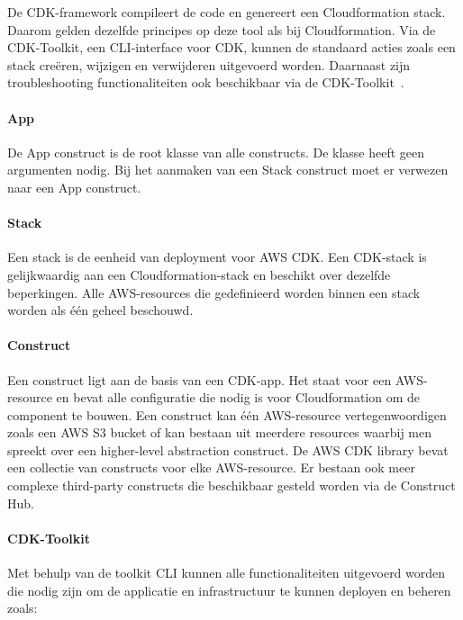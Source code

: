 De CDK-framework compileert de code en genereert een Cloudformation stack.
Daarom gelden dezelfde principes op deze tool als bij Cloudformation.
Via de CDK-Toolkit, een CLI-interface voor CDK, kunnen de standaard acties zoals een stack creëren, wijzigen en verwijderen uitgevoerd worden.
Daarnaast zijn troubleshooting functionaliteiten ook beschikbaar via de CDK-Toolkit~\autocite{Mansoor2014}.

\paragraph{App}

De App construct is de root klasse van alle constructs.
De klasse heeft geen argumenten nodig.
Bij het aanmaken van een Stack construct moet er verwezen naar een App construct.

\paragraph{Stack}

Een stack is de eenheid van deployment voor AWS CDK.
Een CDK-stack is gelijkwaardig aan een Cloudformation-stack en beschikt over dezelfde beperkingen.
Alle AWS-resources die gedefinieerd worden binnen een stack worden als één geheel beschouwd.

\paragraph{Construct}

Een construct ligt aan de basis van een CDK-app.
Het staat voor een AWS-resource en bevat alle configuratie die nodig is voor Cloudformation om de component te bouwen.
Een construct kan één AWS-resource vertegenwoordigen zoals een AWS S3 bucket of kan bestaan uit meerdere resources waarbij men spreekt over een higher-level abstraction construct.
De AWS CDK library bevat een collectie van constructs voor elke AWS-resource.
Er bestaan ook meer complexe third-party constructs die beschikbaar gesteld worden via de Construct Hub.

\paragraph{CDK-Toolkit}

Met behulp van de toolkit CLI kunnen alle functionaliteiten uitgevoerd worden die nodig zijn om de applicatie en infrastructuur te kunnen deployen en beheren zoals:

